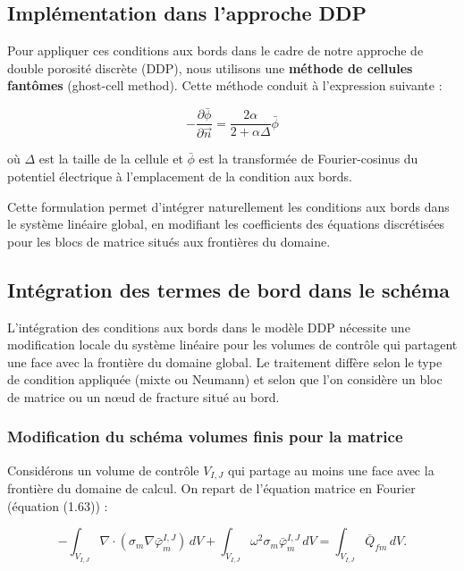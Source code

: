 \subsection{Implémentation dans l'approche DDP}

Pour appliquer ces conditions aux bords dans le cadre de notre approche de double porosité discrète (DDP), nous utilisons une \textbf{méthode de cellules fantômes} (ghost-cell method). Cette méthode conduit à l'expression suivante :

\begin{equation}
-\frac{\partial \bar{\phi}}{\partial \vec{n}} = \frac{2\alpha}{2 + \alpha \Delta} \bar{\phi}
\label{eq:ghost_cell_bc}
\end{equation}

où $\Delta$ est la taille de la cellule et $\bar{\phi}$ est la transformée de Fourier-cosinus du potentiel électrique à l'emplacement de la condition aux bords.

Cette formulation permet d'intégrer naturellement les conditions aux bords dans le système linéaire global, en modifiant les coefficients des équations discrétisées pour les blocs de matrice situés aux frontières du domaine.

\subsection{Intégration des termes de bord dans le schéma}

L'intégration des conditions aux bords dans le modèle DDP nécessite une modification locale du système linéaire pour les volumes de contrôle qui partagent une face avec la frontière du domaine global. Le traitement diffère selon le type de condition appliquée (mixte ou Neumann) et selon que l'on considère un bloc de matrice ou un nœud de fracture situé au bord.

\subsubsection{Modification du schéma volumes finis pour la matrice}

Considérons un volume de contrôle $V_{I,J}$ qui partage au moins une face avec la frontière du domaine de calcul. On repart de l'équation matrice en Fourier (équation (1.63)) :

\begin{equation}
-\int_{V_{I,J}} \nabla\cdot\left(\sigma_m\nabla \bar{\varphi}_m^{I,J}\right)\,dV+\int_{V_{I,J}}\omega^2\sigma_m\bar{\varphi}_m^{I,J}\,dV=\int_{V_{I,J}} \bar{Q}_{fm}\,dV.
\label{eq:matrix_start_163}
\end{equation}

